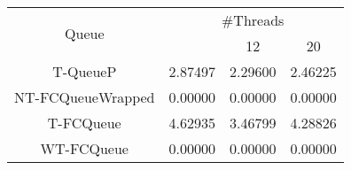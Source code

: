 \begin{tabular}{|c|c|c|c|}
\hline
\multirow{2}{*}{Queue} & \multicolumn{3}{c|}{\#Threads}\\\cline{2-4}& \quad 4 & 12 & 20\\
\hline
\hline
T-QueueP & 2.87497 & 2.29600 & 2.46225\\
NT-FCQueueWrapped & 0.00000 & 0.00000 & 0.00000\\
T-FCQueue & 4.62935 & 3.46799 & 4.28826\\
WT-FCQueue & 0.00000 & 0.00000 & 0.00000\\
\hline\end{tabular}
